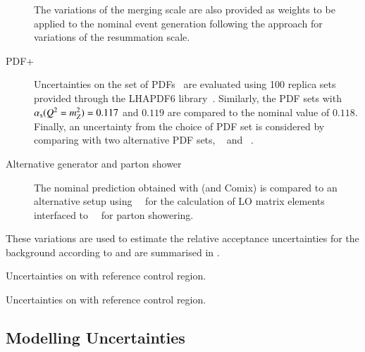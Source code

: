\begin{description}
  The variations of the merging scale are also provided as weights to
  be applied to the nominal event generation following the approach
  for variations of the resummation scale.

\item[PDF+\alphas] Uncertainties on the \NNPDF[3.0nnlo] set of
  PDFs~\cite{Ball:2014uwa} are evaluated using 100 replica sets
  provided through the \textsc{LHAPDF6}
  library~\cite{Buckley:2014ana}. Similarly, the \NNPDF[3.0nnlo] PDF
  sets with $\alpha_{\text{s}}(Q^2=m_{Z}^2) = 0.117$ and $0.119$ are compared to
  the nominal value of $0.118$. Finally, an uncertainty from the
  choice of PDF set is considered by comparing with two alternative
  PDF sets, \MMHT[nnlo68cl]~\cite{Harland-Lang:2014zoa} and
  \CT[14nnlo]~\cite{Dulat:2015mca}.

\item[Alternative generator and parton shower] The nominal prediction
  obtained with \SHERPA[2.2.1] (\OPENLOOPS and Comix) is compared to
  an alternative setup using~\MGNLO[2.2.2]~\cite{Alwall:2014hca} for
  the calculation of LO matrix elements interfaced
  to~\PYTHIA[8.186]~\cite{Sjostrand:2007gs} for parton showering.

\end{description}
These variations are used to estimate the relative acceptance
uncertainties for the \ZHF background according to
 and are summarised in
.

\begin{table}[htbp]
  \centering

  

  \caption{Uncertainties on \ZHF with reference \ZHF control region.}
  \label{tab:uncertainties_zhf_extrapol}
\end{table}


\begin{table}[htbp]
  \centering

  

  \caption{Uncertainties on \ttbar with reference \ZHF control region.}
  \label{tab:uncertainties_ttbar_extrapol}
\end{table}




\subsection{Modelling Uncertainties}
\label{sec:modelling_uncertainties}

